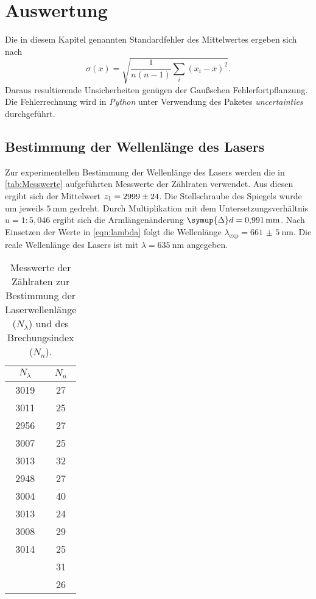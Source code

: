 \section{Auswertung}
\label{sec:Auswertung}
Die in diesem Kapitel genannten Standardfehler des Mittelwertes ergeben sich nach
\begin{equation*}
  \label{eqn:MW-Fehler}
  \sigma(x) = \sqrt{\frac{1}{n(n-1)} \sum_i (x_i - \overline{x})^2}.
\end{equation*}
Daraus resultierende Unsicherheiten genügen der Gaußschen Fehlerfortpflanzung.
Die Fehlerrechnung wird in \textit{Python} unter Verwendung des Paketes \textit{uncertainties} \cite{uncertainties} durchgeführt.

\subsection{Bestimmung der Wellenlänge des Lasers}
\label{subsec:A_Wellenlaenge}
Zur experimentellen Bestimmung der Wellenlänge des Lasers werden die in \autoref{tab:Messwerte} aufgeführten Messwerte der Zählraten verwendet.
Aus diesen ergibt sich der Mittelwert $z_1 = \num{2999+-24}$. 
Die Stellschraube des Spiegels wurde um jeweils $\qty{5}{\milli\metre}$ gedreht. Durch Multiplikation mit dem Untersetzungsverhältnis $u = 1:5,046$ ergibt sich die
Armlängenänderung $\symup{\Delta}d = \qty{0.991}{\milli\metre}$.
Nach Einsetzen der Werte in \autoref{eqn:lambda} folgt die Wellenlänge $\lambda_\text{exp} = \qty{661(5)}{\nano\metre}$. Die reale Wellenlänge des Lasers ist mit 
$\lambda = \qty{635}{\nano\metre}$ angegeben.
\begin{table}
  \centering
  \caption{Messwerte der Zählraten zur Bestimmung der Laserwellenlänge ($N_\lambda$) und des Brechungsindex ($N_n$).}
  \label{tab:Messwerte}
  \begin{tabular}{c c}
    \toprule
      {$N_\lambda$} & {$N_n$} \\
      \midrule
      3019 & 27 \\
      3011 & 25 \\
      2956 & 27 \\
      3007 & 25 \\
      3013 & 32 \\
      2948 & 27 \\
      3004 & 40 \\
      3013 & 24 \\
      3008 & 29 \\
      3014 & 25 \\
           & 31 \\
           & 26 \\
    \bottomrule
  \end{tabular}
\end{table}

